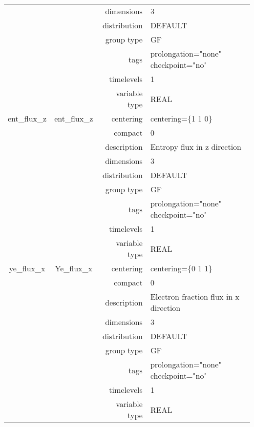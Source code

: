 \begin{tabular*}{150mm}{|c|c@{\extracolsep{\fill}}|rl|}
 &  & dimensions & 3 \\ 
 &  & distribution & DEFAULT \\ 
 &  & group type & GF \\ 
 &  & tags & prolongation="none" checkpoint="no" \\ 
 &  & timelevels & 1 \\ 
 &  & variable type & REAL \\ 
\hline 
ent\_flux\_z & ent\_flux\_z & centering & centering=\{1 1 0\} \\ 
 &  & compact & 0 \\ 
 &  & description & Entropy flux in z direction \\ 
 &  & dimensions & 3 \\ 
 &  & distribution & DEFAULT \\ 
 &  & group type & GF \\ 
 &  & tags & prolongation="none" checkpoint="no" \\ 
 &  & timelevels & 1 \\ 
 &  & variable type & REAL \\ 
\hline 
ye\_flux\_x & Ye\_flux\_x & centering & centering=\{0 1 1\} \\ 
 &  & compact & 0 \\ 
 &  & description & Electron fraction flux in x direction \\ 
 &  & dimensions & 3 \\ 
 &  & distribution & DEFAULT \\ 
 &  & group type & GF \\ 
 &  & tags & prolongation="none" checkpoint="no" \\ 
 &  & timelevels & 1 \\ 
 &  & variable type & REAL \\ 
\hline 
\end{tabular*} 



\vspace{5mm}
\vspace{5mm}

